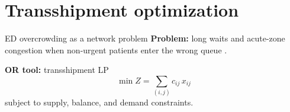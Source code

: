 \section{Transshipment optimization}

\begin{frame}{ED overcrowding as a network problem}
  \small
  \textbf{Problem:} long waits and acute-zone congestion when non-urgent patients enter the wrong queue \citep{Yilmaz2021, Mitchell2023}.

  \vspace{0.15cm}
  \textbf{OR tool:} transshipment LP
  \[
    \min Z = \sum_{(i,j)} c_{ij}\, x_{ij}
  \]
  subject to supply, balance, and demand constraints.

\end{frame}

